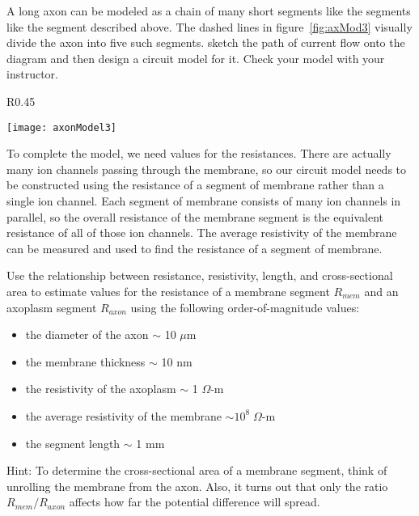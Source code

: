 \par 
A long axon can be modeled as a chain of many short segments like the segments like the segment described above.
The dashed lines in figure~\ref{fig:axMod3} visually divide the axon into five such segments.
sketch the path of current flow onto the diagram and then design a circuit model for it.
Check your model with your instructor.
\par 
\begin{wrapfigure}{R}{0.45\textwidth}
  \vspace{-15pt}  
  \begin{center}
    \texttt{[image: axonModel3]}
  \end{center}
  \caption{Axon chain of many segments.}
  \label{fig:axMod3}
  \vspace{-5pt}
\end{wrapfigure}
To complete the model, we need values for the resistances.
There are actually many ion channels passing through the membrane, so our circuit model needs to be constructed using the resistance of a segment of membrane rather  than a single ion channel.
Each segment of membrane consists of many ion channels in parallel, so the overall resistance of the membrane segment is the equivalent resistance of all of those ion channels. 
The average resistivity of the membrane can be measured and used to find the resistance of a segment of membrane.
\par 
Use the relationship between resistance, resistivity, length, and cross-sectional area to estimate values for the resistance of a membrane segment $R_{mem}$ and an axoplasm segment $R_{axon}$ using the following order-of-magnitude values:
\begin{itemize}
\itemsep-0.2em
\item the diameter of the axon $\sim$ 10 $\mu$m
\item the membrane thickness $\sim$ 10 nm
\item the resistivity of the axoplasm $\sim$ 1 $\Omega$-m
\item the average resistivity of the membrane $\sim  10^{8} \; \Omega$-m
\item the segment length $\sim$ 1 mm
\end{itemize}
Hint: To determine the cross-sectional area of a membrane segment, think of unrolling the membrane from the axon.
Also, it turns out that only the ratio $R_{mem}/R_{axon}$ affects how far the potential difference will spread.

